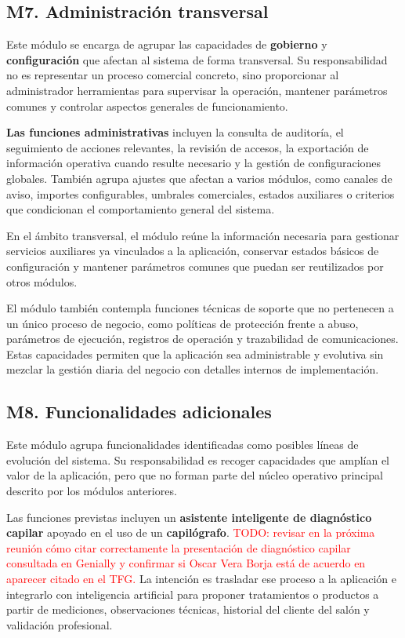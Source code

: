 \subsection{M7. Administración transversal}

Este módulo se encarga de agrupar las capacidades de \textbf{gobierno} y \textbf{configuración} que afectan al sistema de forma transversal. Su responsabilidad no es representar un proceso comercial concreto, sino proporcionar al administrador herramientas para supervisar la operación, mantener parámetros comunes y controlar aspectos generales de funcionamiento.

\textbf{Las funciones administrativas} incluyen la consulta de auditoría, el seguimiento de acciones relevantes, la revisión de accesos, la exportación de información operativa cuando resulte necesario y la gestión de configuraciones globales. También agrupa ajustes que afectan a varios módulos, como canales de aviso, importes configurables, umbrales comerciales, estados auxiliares o criterios que condicionan el comportamiento general del sistema.

En el ámbito transversal, el módulo reúne la información necesaria para gestionar servicios auxiliares ya vinculados a la aplicación, conservar estados básicos de configuración y mantener parámetros comunes que puedan ser reutilizados por otros módulos.

El módulo también contempla funciones técnicas de soporte que no pertenecen a un único proceso de negocio, como políticas de protección frente a abuso, parámetros de ejecución, registros de operación y trazabilidad de comunicaciones. Estas capacidades permiten que la aplicación sea administrable y evolutiva sin mezclar la gestión diaria del negocio con detalles internos de implementación.

\subsection{M8. Funcionalidades adicionales}

Este módulo agrupa funcionalidades identificadas como posibles líneas de evolución del sistema. Su responsabilidad es recoger capacidades que amplían el valor de la aplicación, pero que no forman parte del núcleo operativo principal descrito por los módulos anteriores.

Las funciones previstas incluyen un \textbf{asistente inteligente de diagnóstico capilar} apoyado en el uso de un \textbf{capilógrafo}. \textcolor{red}{TODO: revisar en la próxima reunión cómo citar correctamente la presentación de diagnóstico capilar consultada en Genially y confirmar si Oscar Vera Borja está de acuerdo en aparecer citado en el TFG.} La intención es trasladar ese proceso a la aplicación e integrarlo con inteligencia artificial para proponer tratamientos o productos a partir de mediciones, observaciones técnicas, historial del cliente del salón y validación profesional.

